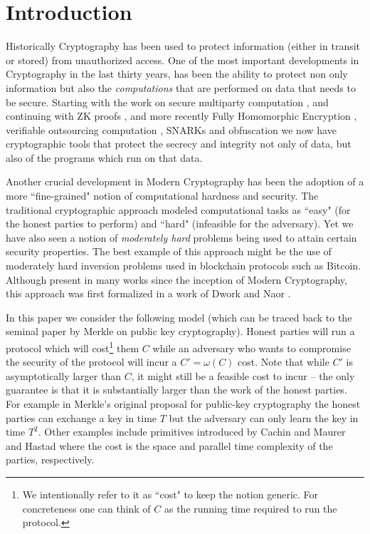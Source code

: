 \section{Introduction}

Historically Cryptography has been used to protect information (either in transit or stored) from unauthorized access. One of the most important developments in Cryptography in the last thirty years, has been the ability to protect non only information but also the {\em computations} that are performed on data that needs to be secure. Starting with the work on secure multiparty computation \cite{mpc}, and continuing with ZK proofs \cite{zk}, and more recently Fully Homomorphic Encryption \cite{gentry}, verifiable outsourcing computation \cite{muggles,ggp10}, SNARKs \cite{qap,snark-linear} and obfuscation \cite{garg2016candidate} we now have cryptographic tools that protect the secrecy and integrity not only of data, but also of the programs which run on that data. 

Another crucial development in Modern Cryptography has been the adoption of a more ``fine-grained" notion of computational hardness and security. The traditional cryptographic approach modeled computational tasks as ``easy" (for the honest parties to perform) and ``hard" (infeasible for the adversary). Yet we have also seen a notion of {\em moderately hard} problems being used to attain certain security properties. The best example of this approach might be the use of moderately hard inversion problems used in blockchain protocols such as Bitcoin. Although present in many works since the inception of Modern Cryptography, this approach was first 
formalized in a work of Dwork and Naor \cite{dn-spam}. 

In this paper we consider the following model (which can be traced back to the seminal paper by Merkle \cite{merkle} on public key cryptography). Honest parties will run a protocol which will cost\footnote{
We intentionally refer to it as ``cost" to keep the notion generic. For concreteness one can think of $C$ as the running time required to run the protocol.} 
them $C$ while an adversary who wants to compromise the security of the protocol will incur a $C'=\omega(C)$ cost. Note that while $C'$ is asymptotically larger than $C$, it might still be a feasible cost to incur -- the only guarantee is that it is 
substantially larger than the work of the honest parties. For example in Merkle's original proposal for public-key cryptography the honest parties can exchange a key in time $T$ but the adversary can only learn the key in time $T^2$. Other examples include primitives introduced by Cachin and
Maurer \cite{maurer} and Hastad \cite{H87} where 
the cost is the space and parallel time complexity of the parties, respectively. 


